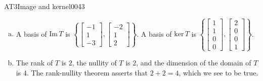 \begin{exercise}{AT3}{Image and kernel}{0043}
\begin{exerciseAnswer}
\begin{enumerate}[(a)]
 
\item  

 A basis of \(\mathrm{Im}\,T\) is \(\left\{ \left[\begin{array}{c}
-1 \\
1 \\
-3
\end{array}\right] , \left[\begin{array}{c}
-2 \\
1 \\
2
\end{array}\right] \right\}\). A basis of \(\mathrm{ker}\,T\) is \(\left\{ \left[\begin{array}{c}
1 \\
1 \\
0 \\
0
\end{array}\right] , \left[\begin{array}{c}
2 \\
0 \\
0 \\
1
\end{array}\right] \right\}\). 

 
\item  

 The rank of \(T\) is \(2\), the nullity of \(T\) is \(2\), and the dimension of the domain of \(T\) is \(4\). The rank-nullity theorem asserts that \(2+2=4\), which we see to be true. 

 
\end{enumerate}

     \end{exerciseAnswer}
 \end{exercise}



